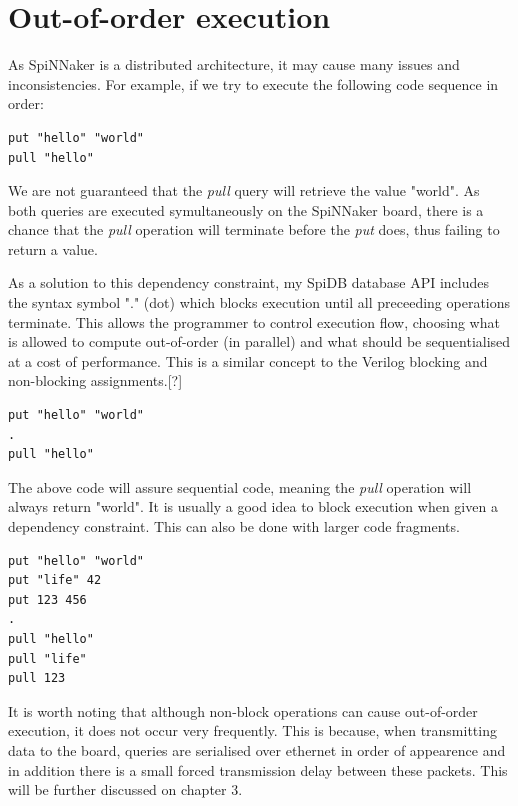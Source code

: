 \section{Out-of-order execution}
\label{sec:out-of-order}
As SpiNNaker is a distributed architecture, it may cause many issues and inconsistencies.
For example, if we try to execute the following code sequence in order:\\
\begin{lstlisting}[caption={Non-blocking execution}, label=list:non-blocking]
put "hello" "world"
pull "hello"
\end{lstlisting}

We are not guaranteed that the \textit{pull} query will retrieve the value "world". As both queries are executed symultaneously on the SpiNNaker board, there is a chance that the \textit{pull} operation will terminate before the \textit{put} does, thus failing to return a value.

As a solution to this dependency constraint, my SpiDB database API includes the syntax symbol "." (dot) which blocks execution until all preceeding operations terminate. This allows the programmer to control execution flow, choosing what is allowed to compute out-of-order (in parallel) and what should be sequentialised at a cost of performance. This is a similar concept to the Verilog blocking and non-blocking assignments.[?]

\begin{lstlisting}[caption={Blocking execution}, label=list:blocking1]
put "hello" "world"
.
pull "hello"
\end{lstlisting}

The above code will assure sequential code, meaning the \textit{pull} operation will always return "world". It is usually a good idea to block execution when given a dependency constraint. This can also be done with larger code fragments.

\begin{lstlisting}[caption={Blocking execution}, label=list:blocking2]
put "hello" "world"
put "life" 42
put 123 456
.
pull "hello"
pull "life"
pull 123
\end{lstlisting}

It is worth noting that although non-block operations can cause out-of-order execution, it does not occur very frequently. This is because, when transmitting data to the board, queries are serialised over ethernet in order of appearence and in addition there is a small forced transmission delay between these packets. This will be further discussed on chapter 3.%

